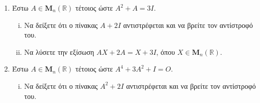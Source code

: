 \documentclass[a4paper,table]{report}
\begin{document}
\begin{enumerate}
  \item Έστω $ A \in \textbf{M}_{n}(\mathbb{R}) $ τέτοιος ώστε $ A^{2}+A=3I $. 
    \begin{enumerate}[i)]
      \item Να δείξετε ότι ο πίνακας $ A+2I $ αντιστρέφεται και να βρείτε τον αντίστροφό
        του.
      \item Να λύσετε την εξίσωση $ AX+2A=X+3I $, όπου 
        $ X \in \textbf{M}_{n}(\mathbb{R}) $.
    \end{enumerate}

  \item Έστω $ A \in \textbf{M}_{n}(\mathbb{R}) $ τέτοιος ώστε $ A^{4}+3A^{2}+I=O $. 
    \begin{enumerate}[i)]
      \item Να δείξετε ότι ο πίνακας $ A^{2}+2I $ αντιστρέφεται και να βρείτε τον 
        αντίστροφό του.
    \end{enumerate}


\end{enumerate}
\end{document}
